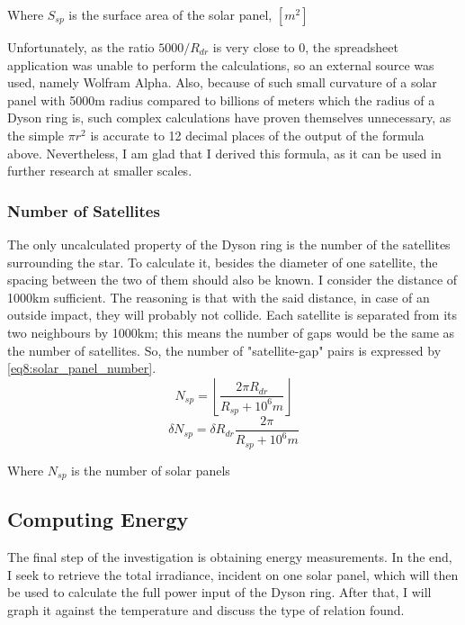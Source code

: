 \documentclass[stu, 11pt, a4paper, floatsintext]{apa7}
\begin{document}
	\begin{center}
		Where $S_{sp}$ is the surface area of the solar panel, $[m^2]$
	\end{center}
	Unfortunately, as the ratio $5000/R_{dr}$ is very close to 0, the spreadsheet application was unable to perform the calculations, so an external source was used, namely Wolfram Alpha. Also, because of such small curvature of a solar panel with 5000m radius compared to billions of meters which the radius of a Dyson ring is, such complex calculations have proven themselves unnecessary, as the simple $\pi r^2$ is accurate to 12 decimal places of the output of the formula above. Nevertheless, I am glad that I derived this formula, as it can be used in further research at smaller scales.
	\subsubsection{Number of Satellites}
	The only uncalculated property of the Dyson ring is the number of the satellites surrounding the star. To calculate it, besides the diameter of one satellite, the spacing between the two of them should also be known. I consider the distance of 1000km sufficient. The reasoning is that with the said distance, in case of an outside impact, they will probably not collide. Each satellite is separated from its two neighbours by 1000km; this means the number of gaps would be the same as the number of satellites. So, the number of "satellite-gap" pairs is expressed by \cref{eq8:solar_panel_number}.
	\begin{equation}
		\label{eq8:solar_panel_number}
		N_{sp}=\left\lfloor\frac{2\pi R_{dr}}{R_{sp} + 10^6m}\right\rfloor
	\end{equation}
	\begin{equation*}
		\delta N_{sp}=\delta R_{dr}\frac{2\pi }{R_{sp} + 10^6m}
	\end{equation*}
	\begin{center}
		Where $N_{sp}$ is the number of solar panels
	\end{center}
	\subsection{Computing Energy}
	The final step of the investigation is obtaining energy measurements. In the end, I seek to retrieve the total irradiance, incident on one solar panel, which will then be used to calculate the full power input of the Dyson ring. After that, I will graph it against the temperature and discuss the type of relation found.
\end{document}
